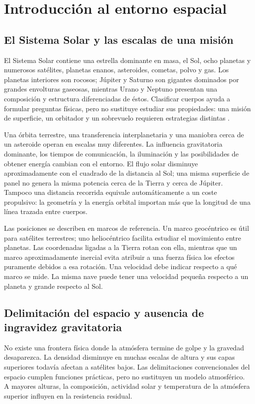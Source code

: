 \chapter{Introducción al entorno espacial}\label{ch:15}

\section{El Sistema Solar y las escalas de una misión}
El Sistema Solar contiene una estrella dominante en masa, el Sol, ocho planetas y numerosos satélites, planetas enanos, asteroides, cometas, polvo y gas. Los planetas interiores son rocosos; Júpiter y Saturno son gigantes dominados por grandes envolturas gaseosas, mientras Urano y Neptuno presentan una composición y estructura diferenciadas de éstos. Clasificar cuerpos ayuda a formular preguntas físicas, pero no sustituye estudiar sus propiedades: una misión de superficie, un orbitador y un sobrevuelo requieren estrategias distintas \cite{NASA-ORBIT}.

Una órbita terrestre, una transferencia interplanetaria y una maniobra cerca de un asteroide operan en escalas muy diferentes. La influencia gravitatoria dominante, los tiempos de comunicación, la iluminación y las posibilidades de obtener energía cambian con el entorno. El flujo solar disminuye aproximadamente con el cuadrado de la distancia al Sol; una misma superficie de panel no genera la misma potencia cerca de la Tierra y cerca de Júpiter. Tampoco una distancia recorrida equivale automáticamente a un coste propulsivo: la geometría y la energía orbital importan más que la longitud de una línea trazada entre cuerpos.

Las posiciones se describen en marcos de referencia. Un marco geocéntrico es útil para satélites terrestres; uno heliocéntrico facilita estudiar el movimiento entre planetas. Las coordenadas ligadas a la Tierra rotan con ella, mientras que un marco aproximadamente inercial evita atribuir a una fuerza física los efectos puramente debidos a esa rotación. Una velocidad debe indicar respecto a qué marco se mide. La misma nave puede tener una velocidad pequeña respecto a un planeta y grande respecto al Sol.

\section{Delimitación del espacio y ausencia de ingravidez gravitatoria}
No existe una frontera física donde la atmósfera termine de golpe y la gravedad desaparezca. La densidad disminuye en muchas escalas de altura y sus capas superiores todavía afectan a satélites bajos. Las delimitaciones convencionales del espacio cumplen funciones prácticas, pero no sustituyen un modelo atmosférico. A mayores alturas, la composición, actividad solar y temperatura de la atmósfera superior influyen en la resistencia residual.

